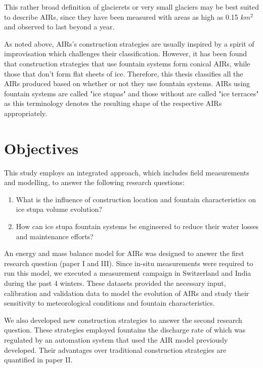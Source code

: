 This rather broad definition of glacierets or very small glaciers may be best suited to describe AIRs, since
they have been measured with areas as high as 0.15 $km^2$ and observed to last beyond a year.

As noted above, \ac{AIRs}'s construction strategies are usually inspired by a spirit of improvisation which challenges their
classification. However, it has been found that construction strategies that use fountain systems form conical
\ac{AIRs}, while those that don't form flat sheets of ice. Therefore, this thesis classifies all the \ac{AIRs} produced
based on whether or not they use fountain systems. \ac{AIRs} using fountain systems are called "ice stupas" and those
without are called "ice terraces" as this terminology denotes the resulting shape of the respective \ac{AIRs}
appropriately.

\section{Objectives}

This study employs an integrated approach, which includes field measurements and modelling, to answer the
following research questions: 

\begin{enumerate}

\item What is the influence of construction location and fountain characteristics on ice stupa volume evolution? 

\item How can ice stupa fountain systems be engineered to reduce their water losses and maintenance efforts?

\end{enumerate}

An energy and mass balance model for \ac{AIRs} was designed to answer the first research question
(paper I and III). Since in-situ measurements were required to run this model, we executed a measurement campaign
in Switzerland and India during the past 4 winters. These datasets provided the necessary input, calibration and
validation data to model the evolution of \ac{AIRs} and study their sensitivity to meteorological conditions and
fountain characteristics. 

We also developed new construction strategies to answer the second research question. These
strategies employed fountains the discharge rate of which was regulated by an automation system that used the AIR model
previously developed. Their advantages over traditional construction strategies are quantified in paper II.

